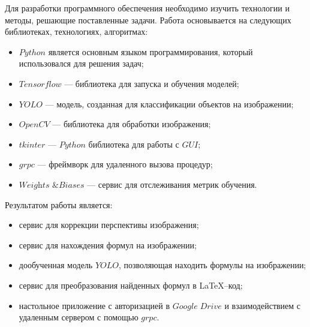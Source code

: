 Для разработки программного обеспечения необходимо изучить технологии и методы, решающие поставленные задачи. Работа основывается на следующих библиотеках, технологиях, алгоритмах:
\begin{itemize}
    \item $Python$ является основным языком программирования, который использовался для решения задач;
    \item $Tensorflow$ --- библиотека для запуска и обучения моделей;
    \item $YOLO$ --- модель, созданная для классификации объектов на изображении;
    \item $OpenCV$ --- библиотека для обработки изображения;
    \item $tkinter$ --- $Python$ библиотека для работы с $GUI$;
    \item $grpc$ --- фреймворк для удаленного вызова процедур;
    \item $\textit{Weights \& Biases}$ --- сервис для отслеживания метрик обучения.
\end{itemize}

Результатом работы является:
\begin{itemize}
    \item сервис для коррекции перспективы изображения;
    \item сервис для нахождения формул на изображении;
    \item дообученная модель $YOLO$, позволяющая находить формулы на изображении;
    \item сервис для преобразования найденных формул в \LaTeX--код;
    \item настольное приложение с авторизацией в $Google\; Drive$ и взаимодействием с удаленным сервером с помощью $grpc$.
\end{itemize}